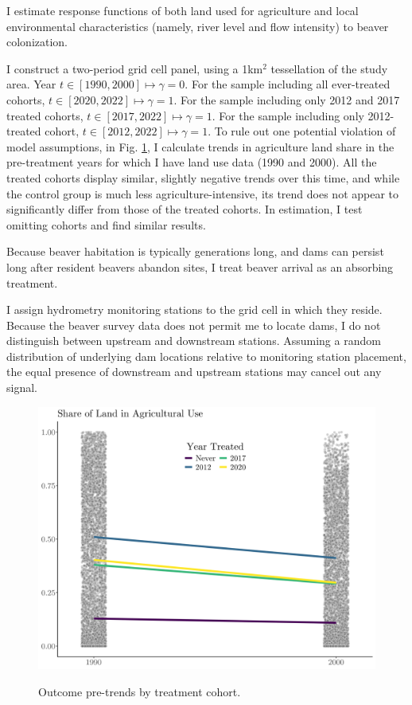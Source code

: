 I estimate response functions of both land used for agriculture and local environmental characteristics (namely, river level and flow intensity) to beaver colonization.

I construct a two-period grid cell panel, using a 1km$^2$ tessellation of the study area. Year $t \in [1990, 2000] \mapsto \gamma = 0$. For the sample including all ever-treated cohorts, $t \in [2020, 2022] \mapsto \gamma = 1$. For the sample including only 2012 and 2017 treated cohorts, $t \in [2017, 2022] \mapsto \gamma = 1$. For the sample including only 2012-treated cohort, $t \in [2012, 2022] \mapsto \gamma = 1$. To rule out one potential violation of model assumptions, in Fig. \ref{fig:outcome-pretrends}, I calculate trends in agriculture land share in the pre-treatment years for which I have land use data (1990 and 2000). All the treated cohorts display similar, slightly negative trends over this time, and while the control group is much less agriculture-intensive, its trend does not appear to significantly differ from those of the treated cohorts. In estimation, I test omitting cohorts and find similar results.

Because beaver habitation is typically generations long, and dams can persist long after resident beavers abandon sites, I treat beaver arrival as an absorbing treatment.

I assign hydrometry monitoring stations to the grid cell in which they reside. Because the beaver survey data does not permit me to locate dams, I do not distinguish between upstream and downstream stations. Assuming a random distribution of underlying dam locations relative to monitoring station placement, the equal presence of downstream and upstream stations may cancel out any signal.

\begin{figure}
    \centering
    \caption{Outcome pre-trends by treatment cohort.}
    \includegraphics[width=0.7\linewidth]{output/figures/outcome_pretrends.png}
    \label{fig:outcome-pretrends}
\end{figure}

